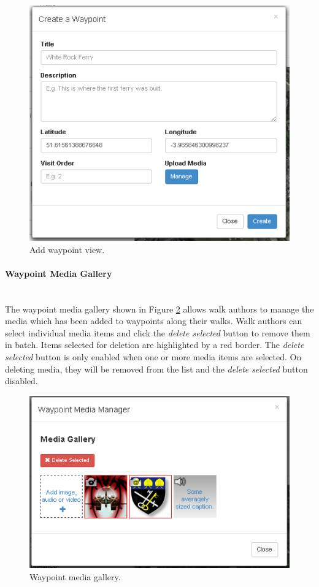 \documentclass[11pt,a4paper]{report}
\begin{document}
\begin{figure}[H]
\centering
\includegraphics[width=0.7\linewidth]{./img/webportal/add-waypoint}
\caption{Add waypoint view.}
\label{fig:add-waypoint}
\end{figure}


\paragraph{Waypoint Media Gallery}\mbox{}\\
The waypoint media gallery shown in Figure \ref{fig:media-gallery} allows walk authors to manage the media which has been added to waypoints along their walks. Walk authors can select individual media items and click the \emph{delete selected} button to remove them in batch. Items selected for deletion are highlighted by a red border. The \emph{delete selected} button is only enabled when one or more media items are selected. On deleting media, they will be removed from the list and the \emph{delete selected} button disabled.

\begin{figure}[H]
\centering
\includegraphics[width=0.7\linewidth]{./img/webportal/media-gallery}
\caption{Waypoint media gallery.}
\label{fig:media-gallery}
\end{figure}
\end{document}
